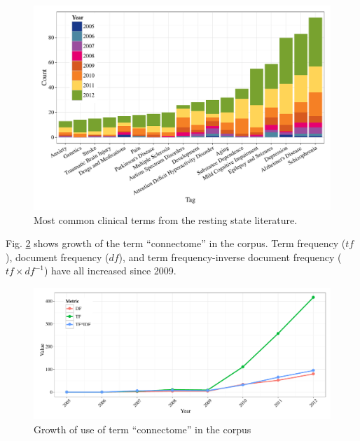 \documentclass[5p]{elsarticle}
\begin{document}
\begin{figure}
  \begin{center}
    \includegraphics[]{figures/clinical_bytag_hist}%
    \caption{Most common clinical terms from the resting state literature.
        \label{fig:clinical_bytag_hist}
    }
  \end{center}
\end{figure}

Fig. \ref{fig:connectome_growth} shows growth of the term ``connectome'' in the
corpus. Term frequency ($t\!f$), document frequency ($d\!f$), and term
frequency-inverse document frequency ($t\!f \times d\!f^{-1}$) have all
increased since 2009.  

\begin{figure}
  \begin{center}
    \includegraphics[width=\linewidth]{figures/connectome_growth}%
    \caption{Growth of use of term ``connectome'' in the corpus
        \label{fig:connectome_growth}
    }
  \end{center}
\end{figure}
\end{document}
